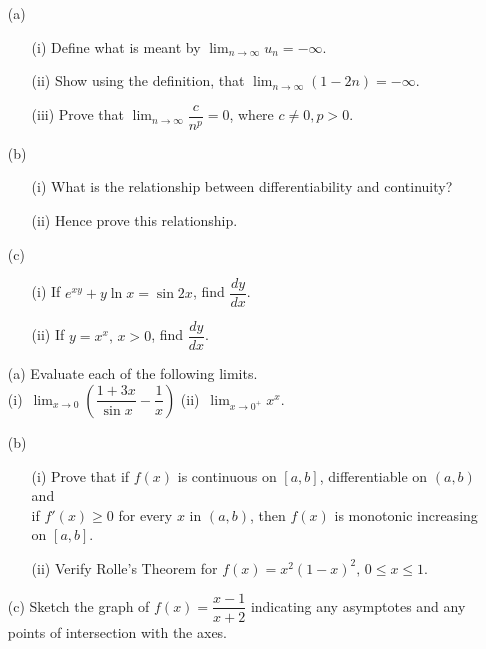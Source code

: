 \documentclass[12pt]{uz-exame}
\begin{document}
\begin{question}
\begin{itemize}
\item[(a)]\begin{itemize}
\item[(i)] Define what is meant by $\displaystyle \lim _{n\rightarrow \infty} u_n=-\infty$. 
\item[(ii)] Show using the definition, that $\displaystyle \lim _{n\rightarrow \infty}(1-2n) =-\infty$. 
\item[(iii)] Prove that $\displaystyle \lim _{n\rightarrow \infty}\dfrac{c}{n^p}=0$, where $c\neq 0, p>0$. 
\end{itemize}
\item[(b)] \begin{itemize}
\item[(i)] What is the relationship between differentiability and continuity? 
\item[(ii)] Hence prove this relationship.
\end{itemize}
\item[(c)]\begin{itemize}
\item[(i)] If $e^{xy}+y\ln x =\sin 2x$, find $\dfrac{dy}{dx}$. 
\item[(ii)] If $y=x^x, \, x>0$, find $\dfrac{dy}{dx}$. 
\end{itemize}
\end{itemize}
\end{question}
\begin{question}
\begin{itemize}
\item[(a)] Evaluate each of the following limits.\\
(i)\, $\displaystyle \lim _{x\rightarrow 0}\left(\dfrac{1+3x}{\sin x}-\dfrac{1}{x}\right)$ \quad \quad (ii)\, $\displaystyle \lim _{x\rightarrow 0^+}x^x$. 
\item[(b)] \begin{itemize}
\item[(i)] Prove that if $f(x)$ is continuous on $[a,b]$, differentiable on $(a,b)$ and\\ if $f'(x)\geq 0$ for every $x$ in $(a,b)$, then $f(x)$ is monotonic increasing on $[a,b]$.
\item[(ii)] Verify Rolle's Theorem for $f(x)=x^2(1-x)^2, \, 0\leq x \leq 1$. 
\end{itemize}
\item[(c)] Sketch the graph of $f(x)=\dfrac{x-1}{x+2}$ indicating any asymptotes and any points of intersection with the axes. 
\end{itemize}
\end{question}
\end{document}
